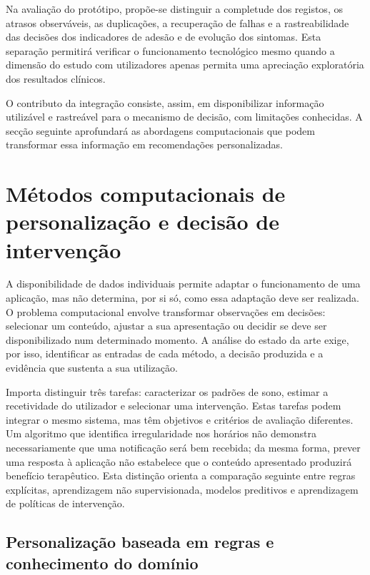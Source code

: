 Na avaliação do protótipo, propõe-se distinguir a completude dos registos, os atrasos observáveis, as duplicações, a recuperação de falhas e a rastreabilidade das decisões dos indicadores de adesão e de evolução dos sintomas. Esta separação permitirá verificar o funcionamento tecnológico mesmo quando a dimensão do estudo com utilizadores apenas permita uma apreciação exploratória dos resultados clínicos.

O contributo da integração consiste, assim, em disponibilizar informação utilizável e rastreável para o mecanismo de decisão, com limitações conhecidas. A secção seguinte aprofundará as abordagens computacionais que podem transformar essa informação em recomendações personalizadas.


\section{Métodos computacionais de personalização e decisão de intervenção}
\label{sec:chap3_computationalPersonalization}

A disponibilidade de dados individuais permite adaptar o funcionamento de uma aplicação, mas não determina, por si só, como essa adaptação deve ser realizada. O problema computacional envolve transformar observações em decisões: selecionar um conteúdo, ajustar a sua apresentação ou decidir se deve ser disponibilizado num determinado momento. A análise do estado da arte exige, por isso, identificar as entradas de cada método, a decisão produzida e a evidência que sustenta a sua utilização.

Importa distinguir três tarefas: caracterizar os padrões de sono, estimar a recetividade do utilizador e selecionar uma intervenção. Estas tarefas podem integrar o mesmo sistema, mas têm objetivos e critérios de avaliação diferentes. Um algoritmo que identifica irregularidade nos horários não demonstra necessariamente que uma notificação será bem recebida; da mesma forma, prever uma resposta à aplicação não estabelece que o conteúdo apresentado produzirá benefício terapêutico. Esta distinção orienta a comparação seguinte entre regras explícitas, aprendizagem não supervisionada, modelos preditivos e aprendizagem de políticas de intervenção.

\subsection{Personalização baseada em regras e conhecimento do domínio}
\label{sec:chap3_ruleBasedPersonalization}

